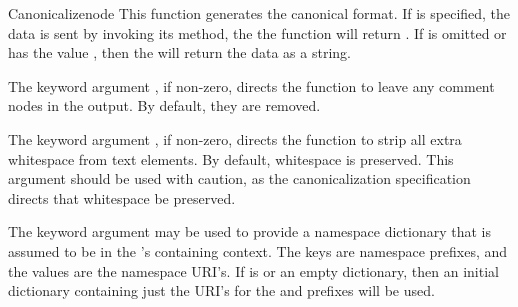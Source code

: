 \documentclass{howto}
\begin{document}
\begin{funcdesc}{Canonicalize}{node}
This function generates the canonical format.
If  is specified, the data is sent by invoking its
 method, the the function will return .
If  is omitted or has the value , then
the  will return the data as a string.

The keyword argument , if non-zero, directs the function
to leave any comment nodes in the output. By default, they are removed.

The keyword argument , if non-zero, directs the function
to strip all extra whitespace from text elements.
By default, whitespace is preserved.
This argument should be used with caution, as the canonicalization
specification directs that whitespace be preserved.

The keyword argument  may be used to provide a namespace
dictionary that is assumed to be in the 's containing
context.
The keys are namespace prefixes, and the values are the namespace URI's.
If  is  or an empty dictionary, then an initial
dictionary containing just the URI's for the  and 
prefixes will be used.
\end{funcdesc}

\end{document}
